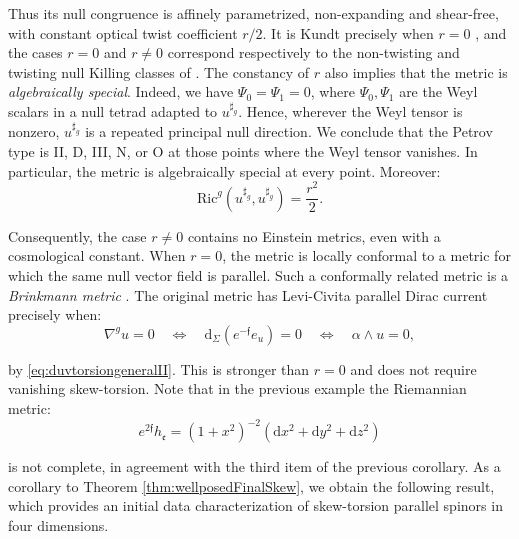 \documentclass[10pt,reqno,a4paper]{amsart}
\theoremstyle{plain}
\theoremstyle{definition}
\theoremstyle{remark}
\theoremstyle{remark}
\def\dd{\mathrm{d}}
\def\fre{\mathfrak{e}}
\newcommand{\Ric}{\mathrm{Ric}}
\renewcommand{\(}{ (}
\renewcommand{\)}{ )}
\newcommand{\frf}{\mathfrak{f}}
\begin{document}
\noindent
Thus its null congruence is affinely parametrized, non-expanding and shear-free, with constant optical twist coefficient $r/2$. It is Kundt precisely when $r=0$ \cite{ColeyKundt}, and the cases $r=0$ and $r\neq0$ correspond respectively to the non-twisting and twisting null Killing classes of \cite[Sections 24.4.1 and 24.4.2]{StephaniExactSolutions}. The constancy of $r$ also implies that the metric is \emph{algebraically special}. Indeed, we have $\Psi_0=\Psi_1=0$, where $\Psi_0,\Psi_1$ are the Weyl scalars in a null tetrad adapted to $u^{\sharp_g}$. Hence, wherever the Weyl tensor is nonzero, $u^{\sharp_g}$ is a repeated principal null direction. We conclude that the Petrov type is II, D, III, N, or O at those points where the Weyl tensor vanishes. In particular, the metric is algebraically special at every point. Moreover:
\begin{equation*}
\Ric^g(u^{\sharp_g},u^{\sharp_g})=\frac{r^2}{2}.
\end{equation*}

\noindent
Consequently, the case $r\neq0$ contains no Einstein metrics, even with a cosmological constant. When $r=0$, the metric is locally conformal to a metric for which the same null vector field is parallel. Such a conformally related metric is a \emph{Brinkmann metric} \cite{MehidiZeghib}. The original metric has Levi-Civita parallel Dirac current precisely when:
\begin{equation*}
\nabla^g u=0
\quad\Longleftrightarrow\quad
\dd_{\Sigma}(e^{-\frf}e_u)=0
\quad\Longleftrightarrow\quad
\alpha\wedge u=0,
\end{equation*}

\noindent
by \eqref{eq:duvtorsiongeneralII}. This is stronger than $r=0$ and does not require vanishing skew-torsion. Note that in the previous example the Riemannian metric:
\begin{equation*}
e^{2\frf} h_{\fre} = (1+x^2)^{-2}(\dd x^2 + \dd y^2 + \dd z^2)
\end{equation*}

\noindent
is not complete, in agreement with the third item of the previous corollary. As a corollary to Theorem \ref{thm:wellposedFinalSkew}, we obtain the following result, which provides an initial data characterization of skew-torsion parallel spinors in four dimensions.
\end{document}
